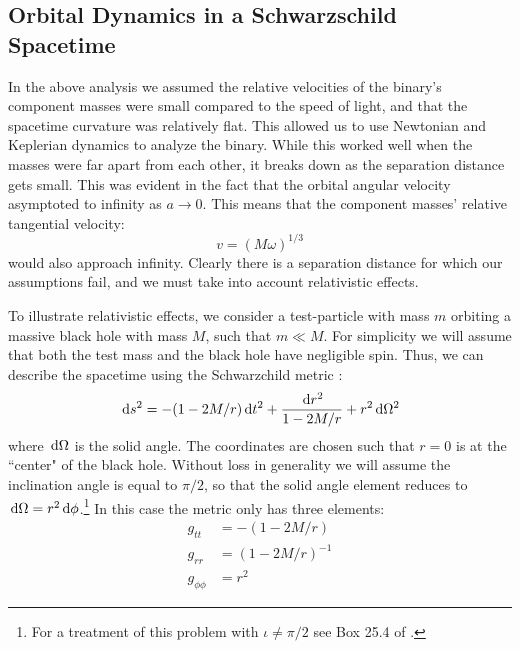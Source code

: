 \subsection{Orbital Dynamics in a Schwarzschild Spacetime}

In the above analysis we assumed the relative velocities of the binary's component masses were small compared to the speed of light, and that the spacetime curvature was relatively flat. This allowed us to use Newtonian and Keplerian dynamics to analyze the binary. While this worked well when the masses were far apart from each other, it breaks down as the separation distance gets small. This was evident in the fact that the orbital angular velocity asymptoted to infinity as $a \rightarrow 0$. This means that the component masses' relative tangential velocity:
\begin{equation}
v = (M\omega)^{1/3}
\end{equation}
would also approach infinity. Clearly there is a separation distance for which our assumptions fail, and we must take into account relativistic effects.

To illustrate relativistic effects, we consider a test-particle with mass $m$ orbiting a massive black hole with mass $M$, such that $m \ll M$. For simplicity we will assume that both the test mass and the black hole have negligible spin. Thus, we can describe the spacetime using the Schwarzchild metric \cite{ref:MTW}:
\begin{equation}
\,\mathrm{d} s^2 = - (1 - 2M/r)\,\mathrm{d} t^2 + \frac{\,\mathrm{d} r^2}{1 - 2M/r} + r^2\,\mathrm{d}\Omega^2
\end{equation}
where $\,\mathrm{d} \Omega$ is the solid angle. The coordinates are chosen such that $r=0$ is at the ``center" of the black hole. Without loss in generality we will assume the inclination angle is equal to $\pi/2$, so that the solid angle element reduces to $\,\mathrm{d}\Omega = r^2\,\mathrm{d}\phi$.\footnote{For a treatment of this problem with $\iota \neq \pi/2$ see Box 25.4 of \cite{ref:MTW}.} In this case the metric only has three elements:
\begin{subequations}
\begin{align}
g_{tt} &= - (1 - 2M/r) \\
g_{rr} &= (1-2M/r)^{-1} \\
g_{\phi\phi} &= r^2
\end{align}
\end{subequations}

